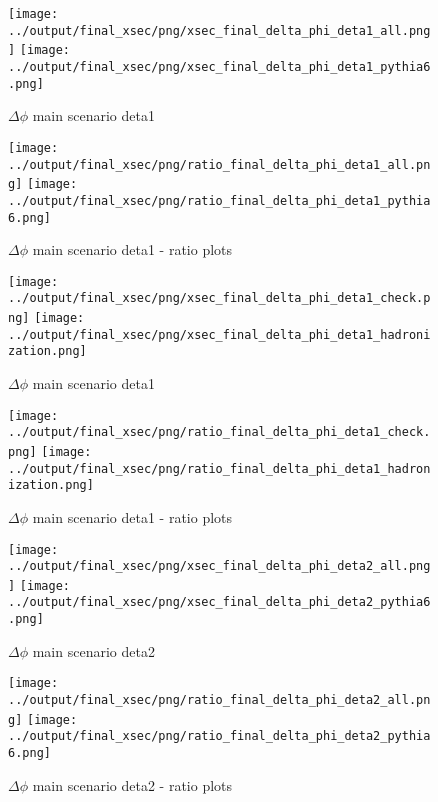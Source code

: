 \documentclass[11pt]{article}
\begin{document}
\begin{figure}[ht]
\centering
\texttt{[image: ../output/final\_xsec/png/xsec\_final\_delta\_phi\_deta1\_all.png]}
\texttt{[image: ../output/final\_xsec/png/xsec\_final\_delta\_phi\_deta1\_pythia6.png]}
\caption{$\Delta\phi$ main scenario deta1}
\label{fig:delta_phi_deta1}
\end{figure}

\begin{figure}[ht]
\centering
\texttt{[image: ../output/final\_xsec/png/ratio\_final\_delta\_phi\_deta1\_all.png]}
\texttt{[image: ../output/final\_xsec/png/ratio\_final\_delta\_phi\_deta1\_pythia6.png]}
\caption{$\Delta\phi$ main scenario deta1 - ratio plots}
\label{fig:delta_phi_deta1_ratio}
\end{figure}

\begin{figure}[ht]
\centering
\texttt{[image: ../output/final\_xsec/png/xsec\_final\_delta\_phi\_deta1\_check.png]}
\texttt{[image: ../output/final\_xsec/png/xsec\_final\_delta\_phi\_deta1\_hadronization.png]}
\caption{$\Delta\phi$ main scenario deta1}
\label{fig:delta_phi_deta1b}
\end{figure}

\begin{figure}[ht]
\centering
\texttt{[image: ../output/final\_xsec/png/ratio\_final\_delta\_phi\_deta1\_check.png]}
\texttt{[image: ../output/final\_xsec/png/ratio\_final\_delta\_phi\_deta1\_hadronization.png]}
\caption{$\Delta\phi$ main scenario deta1 - ratio plots}
\label{fig:delta_phi_deta1b_ratio}
\end{figure}

\begin{figure}[ht]
\centering
\texttt{[image: ../output/final\_xsec/png/xsec\_final\_delta\_phi\_deta2\_all.png]}
\texttt{[image: ../output/final\_xsec/png/xsec\_final\_delta\_phi\_deta2\_pythia6.png]}
\caption{$\Delta\phi$ main scenario deta2}
\label{fig:delta_phi_deta2}
\end{figure}

\begin{figure}[ht]
\centering
\texttt{[image: ../output/final\_xsec/png/ratio\_final\_delta\_phi\_deta2\_all.png]}
\texttt{[image: ../output/final\_xsec/png/ratio\_final\_delta\_phi\_deta2\_pythia6.png]}
\caption{$\Delta\phi$ main scenario deta2 - ratio plots}
\label{fig:delta_phi_deta2_ratio}
\end{figure}
\end{document}
